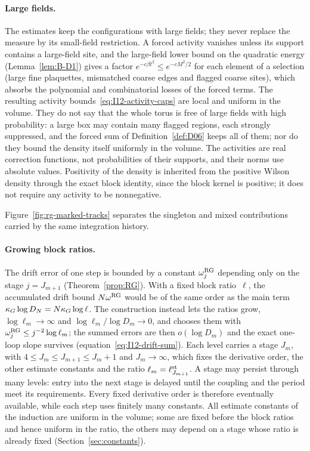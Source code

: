 \paragraph{Large fields.}
The estimates keep the configurations with large fields; they never replace the measure by its small-field restriction. A forced activity vanishes unless its support contains a large-field site, and the large-field lower bound on the quadratic energy (Lemma~\ref{lem:B-D1}) gives a factor $e^{-c\beta t^2}\le e^{-cM^2/2}$ for each element of a selection (large fine plaquettes, mismatched coarse edges and flagged coarse sites), which absorbs the polynomial and combinatorial losses of the forced terms. The resulting activity bounds~\eqref{eq:I12-activity-caps} are local and uniform in the volume. They do not say that the whole torus is free of large fields with high probability: a large box may contain many flagged regions, each strongly suppressed, and the forced sum of Definition~\ref{def:D06} keeps all of them; nor do they bound the density itself uniformly in the volume. The activities are real correction functions, not probabilities of their supports, and their norms use absolute values. Positivity of the density is inherited from the positive Wilson density through the exact block identity, since the block kernel is positive; it does not require any activity to be nonnegative.

Figure~\ref{fig:rg-marked-tracks} separates the singleton and mixed contributions carried by the same integration history.



\paragraph{Growing block ratios.}
The drift error of one step is bounded by a constant $\omega^{\rm RG}_j$ depending only on the stage $j=J_{m+1}$ (Theorem~\ref{prop:RG}). With a fixed block ratio~$\ell$, the accumulated drift bound $N\omega^{\rm RG}$ would be of the same order as the main term $\kappa_G\log D_N=N\kappa_G\log\ell$. The construction instead lets the ratios grow, $\log\ell_m\to\infty$ and $\log\ell_m/\log D_m\to0$, and chooses them with $\omega^{\rm RG}_j\le j^{-2}\log\ell_m$; the summed errors are then $o(\log D_m)$ and the exact one-loop slope survives (equation~\eqref{eq:I12-drift-sum}). Each level carries a stage $J_m$, with $4\le J_m\le J_{m+1}\le J_m+1$ and $J_m\to\infty$, which fixes the derivative order, the other estimate constants and the ratio $\ell_m=\ell^{\rm st}_{J_{m+1}}$. A stage may persist through many levels: entry into the next stage is delayed until the coupling and the period meet its requirements. Every fixed derivative order is therefore eventually available, while each step uses finitely many constants. All estimate constants of the induction are uniform in the volume; some are fixed before the block ratios and hence uniform in the ratio, the others may depend on a stage whose ratio is already fixed (Section~\ref{sec:constants}).

